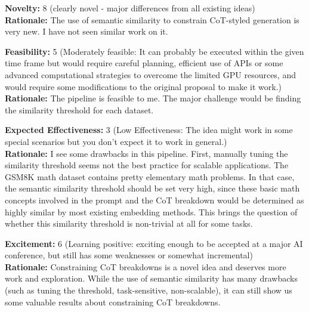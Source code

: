 \newpage 


\begin{tcolorbox}[colback=green!10!white, colframe=green!80!black, title=\textbf{Reviewer 1}]
\small
\textbf{Novelty:} 8 (clearly novel - major differences from all existing ideas)\\
\textbf{Rationale:} The use of semantic similarity to constrain CoT-styled generation is very new. I have not seen similar work on it.

\vspace{10pt}

\textbf{Feasibility:} 5 (Moderately feasible: It can probably be executed within the given time frame but would require careful planning, efficient use of APIs or some advanced computational strategies to overcome the limited GPU resources, and would require some modifications to the original proposal to make it work.)\\
\textbf{Rationale:} The pipeline is feasible to me. The major challenge would be finding the similarity threshold for each dataset.

\vspace{10pt}

\textbf{Expected Effectiveness:} 3 (Low Effectiveness: The idea might work in some special scenarios but you don't expect it to work in general.)\\
\textbf{Rationale:} I see some drawbacks in this pipeline. First, manually tuning the similarity threshold seems not the best practice for scalable applications. The GSM8K math dataset contains pretty elementary math problems. In that case, the semantic similarity threshold should be set very high, since these basic math concepts involved in the prompt and the CoT breakdown would be determined as highly similar by most existing embedding methods. This brings the question of whether this similarity threshold is non-trivial at all for some tasks.

\vspace{10pt}

\textbf{Excitement:} 6 (Learning positive: exciting enough to be accepted at a major AI conference, but still has some weaknesses or somewhat incremental)\\
\textbf{Rationale:} Constraining CoT breakdowns is a novel idea and deserves more work and exploration. While the use of semantic similarity has many drawbacks (such as tuning the threshold, task-sensitive, non-scalable), it can still show us some valuable results about constraining CoT breakdowns.


\end{tcolorbox}
